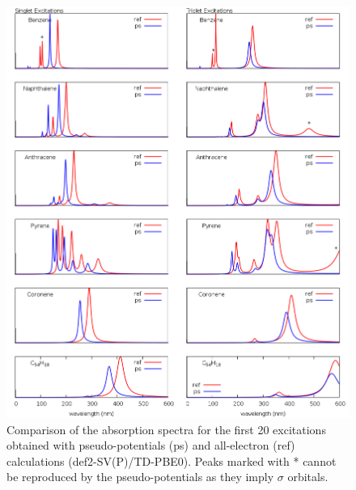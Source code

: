 \documentclass[12pt]{article}
\begin{document}

\begin{figure}
\begin{center}
\includegraphics[width=16cm]{grand_rpa}
\end{center}
\vspace{0.25in}
\hspace*{3in}
\caption{Comparison of the absorption spectra for the first 20 excitations obtained with
pseudo-potentials (ps) and all-electron (ref) calculations (def2-SV(P)/TD-PBE0). Peaks marked
with * cannot be reproduced by the pseudo-potentials as they imply $\sigma$ orbitals.}
\label{fig:cnhn_uv}
\end{figure}
\end{document}
